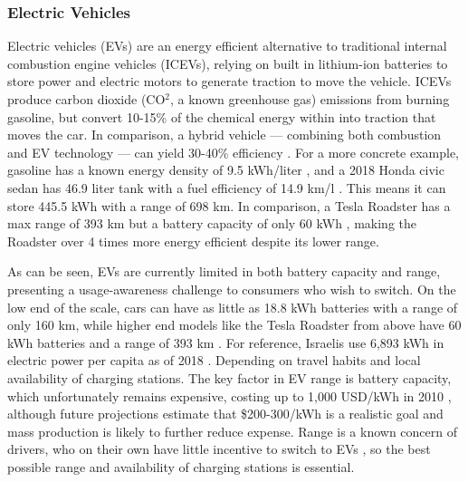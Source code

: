 \documentclass{article}                         %
\begin{document}
\subsubsection{Electric Vehicles}
Electric vehicles (EVs) are an energy efficient alternative to traditional internal combustion engine vehicles (ICEVs), relying on built in lithium-ion batteries to store power and electric motors to generate traction to move the vehicle. ICEVs produce carbon dioxide (CO$^2$, a known greenhouse gas) emissions from burning gasoline, but convert 10-15\% of the chemical energy within into traction that moves the car. In comparison, a hybrid vehicle --- combining both combustion and EV technology --- can yield 30-40\% efficiency \cite{Zhu2015DistributedGrid}. For a more concrete example, gasoline has a known energy density of 9.5 kWh/liter \cite{EngineeringFactors}, and a 2018 Honda civic sedan has 46.9 liter tank with a fuel efficiency of 14.9 km/l \cite{20182018Information}. This means it can store 445.5 kWh with a range of 698 km. In comparison, a Tesla Roadster has a max range of 393 km but a battery capacity of only 60 kWh \cite{Friel2010ManagementVehicles}, making the Roadster over 4 times more energy efficient despite its lower range.

As can be seen, EVs are currently limited in both battery capacity and range, presenting a usage-awareness challenge to consumers who wish to switch. On the low end of the scale, cars can have as little as 18.8 kWh batteries with a range of only 160 km, while higher end models like the Tesla Roadster from above have 60 kWh batteries and a range of 393 km \cite{20182018Information}. For reference, Israelis use 6,893 kWh in electric power per capita as of 2018 \cite{2018Key2018}. Depending on travel habits and local availability of charging stations. The key factor in EV range is battery capacity, which unfortunately remains expensive, costing up to 1,000 USD/kWh in 2010 \cite{Mock2010MarketVehicles}, although future projections estimate that \$200-300/kWh is a realistic goal and mass production is likely to further reduce expense. Range is a known concern of drivers, who on their own have little incentive to switch to EVs \cite{Mock2010MarketVehicles}, so the best possible range and availability of charging stations is essential.
\end{document}
